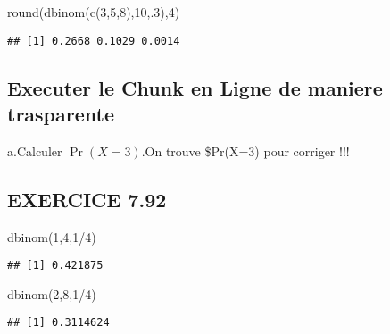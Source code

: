 \documentclass[
]{article}
\newenvironment{Shaded}{\begin{snugshade}}{\end{snugshade}}
\newcommand{\DecValTok}[1]{\textcolor[rgb]{0.00,0.00,0.81}{#1}}
\newcommand{\FunctionTok}[1]{\textcolor[rgb]{0.00,0.00,0.00}{#1}}
\newcommand{\NormalTok}[1]{#1}
\newcommand{\SpecialCharTok}[1]{\textcolor[rgb]{0.00,0.00,0.00}{#1}}
\begin{document}
\begin{Shaded}
\begin{Highlighting}[]
\FunctionTok{round}\NormalTok{(}\FunctionTok{dbinom}\NormalTok{(}\FunctionTok{c}\NormalTok{(}\DecValTok{3}\NormalTok{,}\DecValTok{5}\NormalTok{,}\DecValTok{8}\NormalTok{),}\DecValTok{10}\NormalTok{,.}\DecValTok{3}\NormalTok{),}\DecValTok{4}\NormalTok{)}
\end{Highlighting}
\end{Shaded}

\begin{verbatim}
## [1] 0.2668 0.1029 0.0014
\end{verbatim}

\hypertarget{executer-le-chunk-en-ligne-de-maniere-trasparente}{%
\subsection{Executer le Chunk en Ligne de maniere
trasparente}\label{executer-le-chunk-en-ligne-de-maniere-trasparente}}

a.Calculer \(\Pr(X=3)\).On trouve \$Pr(X=3) pour corriger !!!

\hypertarget{exercice-7.92}{%
\subsection{EXERCICE 7.92}\label{exercice-7.92}}

\begin{Shaded}
\begin{Highlighting}[]
\FunctionTok{dbinom}\NormalTok{(}\DecValTok{1}\NormalTok{,}\DecValTok{4}\NormalTok{,}\DecValTok{1}\SpecialCharTok{/}\DecValTok{4}\NormalTok{)}
\end{Highlighting}
\end{Shaded}

\begin{verbatim}
## [1] 0.421875
\end{verbatim}

\begin{Shaded}
\begin{Highlighting}[]
\FunctionTok{dbinom}\NormalTok{(}\DecValTok{2}\NormalTok{,}\DecValTok{8}\NormalTok{,}\DecValTok{1}\SpecialCharTok{/}\DecValTok{4}\NormalTok{)}
\end{Highlighting}
\end{Shaded}

\begin{verbatim}
## [1] 0.3114624
\end{verbatim}
\end{document}
